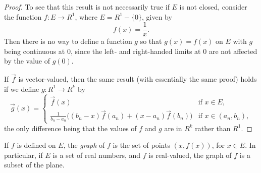 \begin{proof}
  To see that this result is not necessarily true if $E$ is not
  closed, consider the function $f\colon E\to R^1$, where
  $E = R^1 - \{0\}$, given by
  \begin{equation*}
    f(x) = \frac1x.
  \end{equation*}
  Then there is no way to define a function $g$ so that $g(x) = f(x)$
  on $E$ with $g$ being continuous at $0$, since the left- and
  right-handed limits at $0$ are not affected by the value of $g(0)$.

  If $\vec{f}$ is vector-valued, then the same result (with
  essentially the same proof) holds if we define $g\colon R^1\to R^k$
  by
  \begin{equation*}
    \vec{g}(x) =
    \begin{cases}
      \vec{f}(x) & \text{if $x\in E$}, \\
      \frac1{b_n - a_n}\big((b_n - x)\vec{f}(a_n)
      + (x - a_n)\vec{f}(b_n)\big) & \text{if $x\in(a_n,b_n)$},
    \end{cases}
  \end{equation*}
  the only difference being that the values of $f$ and $g$ are in
  $R^k$ rather than $R^1$.
\end{proof}

 If $f$ is defined on $E$, the {\em graph} of $f$ is the set
of points $(x,f(x))$, for $x\in E$. In particular, if $E$ is a set of
real numbers, and $f$ is real-valued, the graph of $f$ is a subset of
the plane.

